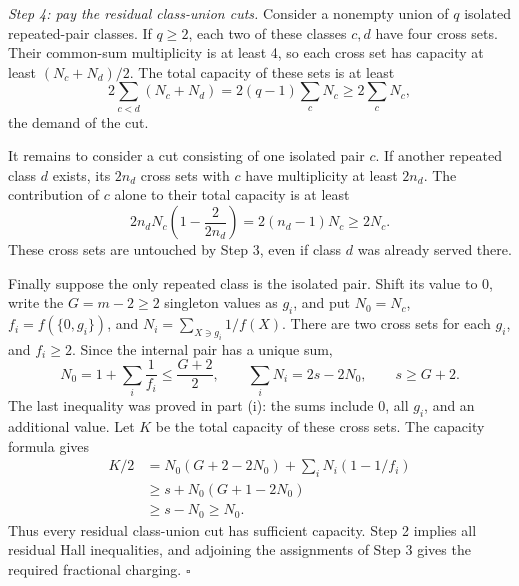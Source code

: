 \documentclass[11pt]{article}
\theoremstyle{plain}
\begin{document}
\emph{Step 4: pay the residual class-union cuts.} Consider a nonempty union of $q$ isolated repeated-pair classes. If $q\ge2$, each two of these classes $c,d$ have four cross sets. Their common-sum multiplicity is at least 4, so each cross set has capacity at least $(N_c+N_d)/2$. The total capacity of these sets is at least
\[
2\sum_{c<d}(N_c+N_d)=2(q-1)\sum_c N_c\ge2\sum_cN_c,
\]
the demand of the cut.

It remains to consider a cut consisting of one isolated pair $c$. If another repeated class $d$ exists, its $2n_d$ cross sets with $c$ have multiplicity at least $2n_d$. The contribution of $c$ alone to their total capacity is at least
\[
2n_dN_c\left(1-\frac2{2n_d}\right)=2(n_d-1)N_c\ge2N_c.
\]
These cross sets are untouched by Step 3, even if class $d$ was already served there.

Finally suppose the only repeated class is the isolated pair. Shift its value to 0, write the $G=m-2\ge2$ singleton values as $g_i$, and put $N_0=N_c$, $f_i=f(\{0,g_i\})$, and $N_i=\sum_{X\ni g_i}1/f(X)$. There are two cross sets for each $g_i$, and $f_i\ge2$. Since the internal pair has a unique sum,
\[
N_0=1+\sum_i\frac1{f_i}\le\frac{G+2}{2},\qquad
\sum_iN_i=2s-2N_0,\qquad s\ge G+2.
\]
The last inequality was proved in part (i): the sums include 0, all $g_i$, and an additional value. Let $K$ be the total capacity of these cross sets. The capacity formula gives
\begin{align*}
K/2&=N_0(G+2-2N_0)+\sum_iN_i(1-1/f_i)\\
&\ge s+N_0(G+1-2N_0)\\
&\ge s-N_0\ge N_0.
\end{align*}
Thus every residual class-union cut has sufficient capacity. Step 2 implies all residual Hall inequalities, and adjoining the assignments of Step 3 gives the required fractional charging. $\square$
\end{document}
